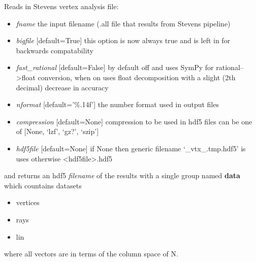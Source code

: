 \documentclass[a4paper,11pt,english]{sphinxmanual}
\begin{document}
\begin{fulllineitems}
\label{modules_doc:cbmpy.CBRead.readSK_vertex}
Reads in Stevens vertex analysis file:
\begin{itemize}
\item {} 
\emph{fname} the input filename (.all file that results from Stevens pipeline)

\item {} 
\emph{bigfile} {[}default=True{]} this option is now always true and is left in for backwards compatability

\item {} 
\emph{fast\_rational} {[}default=False{]} by default off and uses SymPy for rational--\textgreater{}float conversion, when on uses float decomposition with a slight (2th decimal) decrease in accuracy

\item {} 
\emph{nformat} {[}default='\%.14f'{]} the number format used in output files

\item {} 
\emph{compression} {[}default=None{]} compression to be used in hdf5 files can be one of {[}None, `lzf', `gz?', `szip'{]}

\item {} 
\emph{hdf5file} {[}default=None{]} if None then generic filename `\_vtx\_.tmp.hdf5' is uses otherwise \textless{}hdf5file\textgreater{}.hdf5

\end{itemize}

and returns an hdf5 \emph{filename} of the results with a single group named \textbf{data} which countains datasets
\begin{itemize}
\item {} 
vertices

\item {} 
rays

\item {} 
lin

\end{itemize}

where all vectors are in terms of the column space of N.

\end{fulllineitems}

\end{document}
